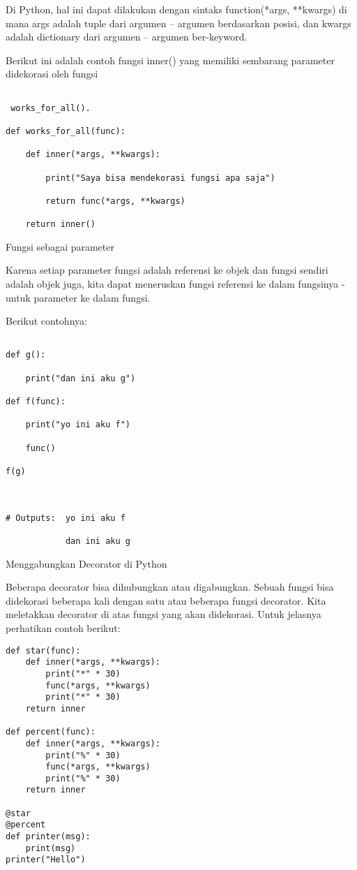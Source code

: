 Di Python, hal ini dapat dilakukan dengan sintaks function(*args, **kwargs) di mana args adalah tuple dari argumen – argumen berdasarkan posisi, dan kwargs adalah dictionary dari argumen – argumen ber-keyword.

Berikut ini adalah contoh fungsi inner() yang memiliki sembarang parameter didekorasi oleh fungsi

\begin{verbatim}

 works_for_all().

def works_for_all(func):

    def inner(*args, **kwargs):

        print("Saya bisa mendekorasi fungsi apa saja")

        return func(*args, **kwargs)

    return inner()

\end{verbatim}



Fungsi sebagai parameter

Karena setiap parameter fungsi adalah referensi ke objek dan fungsi sendiri adalah objek juga, kita dapat meneruskan fungsi referensi ke dalam fungsinya - untuk parameter ke dalam fungsi.

Berikut contohnya: 

\begin{verbatim}

def g():

    print("dan ini aku g")

def f(func):

    print("yo ini aku f")

    func() 

f(g)



# Outputs: 	yo ini aku f

			dan ini aku g

\end{verbatim}

Menggabungkan Decorator di Python

Beberapa decorator bisa dihubungkan atau digabungkan. Sebuah fungsi bisa didekorasi beberapa kali dengan satu atau beberapa fungsi decorator. Kita meletakkan decorator di atas fungsi yang akan didekorasi. Untuk jelasnya perhatikan contoh berikut:
\begin{verbatim}
def star(func):
    def inner(*args, **kwargs):
        print("*" * 30)
        func(*args, **kwargs)
        print("*" * 30)
    return inner

def percent(func):
    def inner(*args, **kwargs):
        print("%" * 30)
        func(*args, **kwargs)
        print("%" * 30)
    return inner

@star
@percent
def printer(msg):
    print(msg)
printer("Hello")
\end{verbatim}

